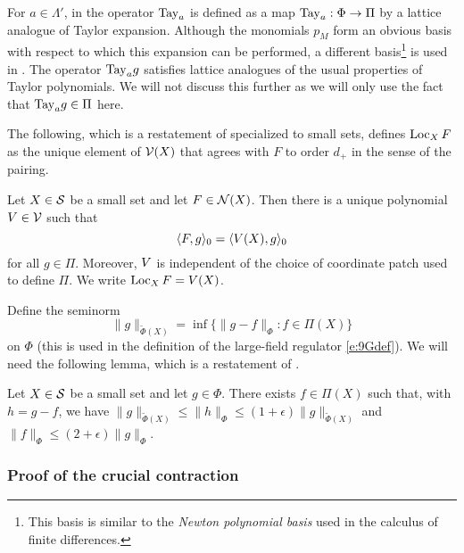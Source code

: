 For $a\in\Lambda'$, in \cite{BS-rg-loc} the operator ${\rm Tay}_a$ is defined as a map
${\rm Tay}_a : \Phi \rightarrow \Pi$
by a lattice analogue of Taylor expansion. Although the monomials $p_M$ form an obvious
basis with respect to which this expansion can be performed, a different
basis\footnote{This basis is similar to the \emph{Newton polynomial basis} used
in the calculus of finite differences.} is used in
\cite{BS-rg-loc}. The operator ${\rm Tay}_a g$ satisfies lattice analogues of the usual properties
of Taylor polynomials. We will not discuss this further as we will only use the fact
that ${\rm Tay}_a g \in \Pi$ here.

The following, which is a restatement of \cite[Proposition~\ref{loc-prop:LTsymexists}]{BS-rg-IE}
specialized to small sets,
defines $\operatorname{Loc}_X F$ as the unique element of $\mathcal{V}(X)$ that agrees with $F$ to
order $d_+$ in the sense of the pairing.

\begin{prop}
\label{prop:LTsymexists}
Let $X\in\mathcal{S}$ be a small set and let $F\in\mathcal{N}(X)$.
Then there is a unique polynomial $V\in\mathcal{V}$ such that
\begin{equation}
\langle F, g \rangle_0 = \langle V(X), g \rangle_0
\end{equation}
for all $g\in\Pi$. Moreover, $V$ is independent of the
choice of coordinate patch used to define $\Pi$. We write
$\operatorname{Loc}_X F = V(X)$.
\end{prop}

Define the seminorm
\begin{equation}
\label{e:Phitilde}
\|g\|_{\tilde\Phi(X)} = \inf\{ \|g - f\|_\Phi : f\in\Pi(X) \}
\end{equation}
on $\Phi$ (this is used in the definition of the large-field
regulator \eqref{e:9Gdef}).
We will need the following lemma, which is a restatement of
\cite[Lemma~\ref{loc-lem:testfndecomp}]{BS-rg-loc}.

\begin{lemma}
\label{lem:testfndecomp}
Let $X\in\mathcal{S}$ be a small set and let $g\in\Phi$.
There exists $f\in\Pi(X)$ such that, with $h = g - f$, we have
$\|g\|_{\tilde\Phi(X)} \le \|h\|_\Phi \le (1 + \epsilon) \|g\|_{\tilde\Phi(X)}$
and $\|f\|_\Phi \le (2 + \epsilon) \|g\|_\Phi$.
\end{lemma}

\subsubsection{Proof of the crucial contraction}

